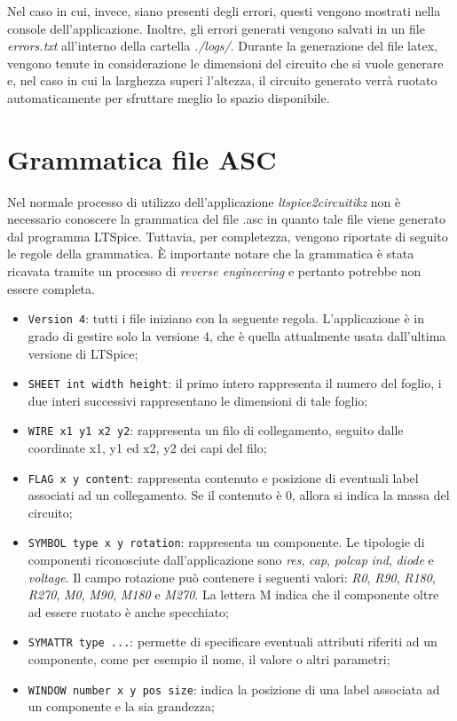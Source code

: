 Nel caso in cui, invece, siano presenti degli errori, questi vengono mostrati nella console dell'applicazione. Inoltre, gli errori generati vengono salvati in un file \textit{errors.txt} all'interno della cartella \textit{./logs/}.
Durante la generazione del file latex, vengono tenute in considerazione le dimensioni del circuito che si vuole generare e, nel caso in cui la larghezza superi l'altezza, il circuito generato verrà ruotato automaticamente per sfruttare meglio lo spazio disponibile. 

\clearpage

\section{Grammatica file ASC}
Nel normale processo di utilizzo dell'applicazione \textit{ltspice2circuitikz} non è necessario conoscere la grammatica del file .asc in quanto tale file viene generato dal programma LTSpice. Tuttavia, per completezza, vengono riportate di seguito le regole della grammatica. È importante notare che la grammatica è stata ricavata tramite un processo di \textit{reverse engineering} e pertanto potrebbe non essere completa.
\begin{itemize}
	\item \texttt{Version 4}: tutti i file iniziano con la seguente regola. L'applicazione è in grado di gestire solo la versione 4, che è quella attualmente usata dall'ultima versione di LTSpice;
	\item \texttt{SHEET int width height}: il primo intero rappresenta il numero del foglio, i due interi successivi rappresentano le dimensioni di tale foglio;
	\item \texttt{WIRE x1 y1 x2 y2}: rappresenta un filo di collegamento, seguito dalle coordinate x1, y1 ed x2, y2 dei capi del filo;
	\item \texttt{FLAG x y content}: rappresenta contenuto e posizione di eventuali label associati ad un collegamento. Se il contenuto è 0, allora si indica la massa del circuito;
	\item \texttt{SYMBOL type x y rotation}: rappresenta un componente. Le tipologie di componenti riconosciute dall'applicazione sono \textit{res}, \textit{cap}, \textit{polcap} \textit{ind}, \textit{diode} e \textit{voltage}. Il campo rotazione può contenere i seguenti valori: \textit{R0}, \textit{R90}, \textit{R180}, \textit{R270}, \textit{M0}, \textit{M90}, \textit{M180} e \textit{M270}. La lettera M indica che il componente oltre ad essere ruotato è anche specchiato;
	\item \texttt{SYMATTR type ...}: permette di specificare eventuali attributi riferiti ad un componente, come per esempio il nome, il valore o altri parametri;
	\item \texttt{WINDOW number x y pos size}: indica la posizione di una label associata ad un componente e la sia grandezza;
	
	  
\end{itemize}


